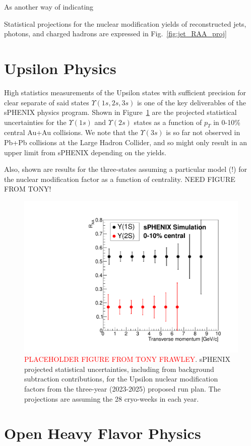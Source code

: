 As another way of indicating 

Statistical projections for the nuclear modification  yields of reconstructed jets, photons, and charged hadrons are expressed in Fig.~\ref{fig:jet_RAA_proj} 

\section{Upsilon Physics}
\label{sec:upsilon}

High statistics measurements of the Upsilon states with sufficient precision for clear separate of said states $\Upsilon(1s,2s,3s)$ is one of the key deliverables of the sPHENIX physics program.  Shown in Figure~\ref{fig:upsilon3years} are the projected statistical uncertainties for the $\Upsilon(1s)$ and $\Upsilon(2s)$ states as a function of $p_{T}$ in 0-10\% central Au+Au collisions.   We note that the $\Upsilon(3s)$ is so far not observed in Pb+Pb collisions at the Large Hadron Collider, and so might only result in an upper limit from sPHENIX depending on the yields.   

Also, shown are results for the three-states assuming a particular model (!) for the nuclear modification factor as a function of centrality.   NEED FIGURE FROM TONY!

\begin{figure}
    \centering
    \includegraphics[width=0.55\linewidth]{figs/BUP_Upsilon_RAA_3yr_28wks.pdf}
    \caption{{\textcolor{red}{PLACEHOLDER FIGURE FROM TONY FRAWLEY}}. sPHENIX projected statistical uncertainties, including from background subtraction contributions, for the Upsilon nuclear modification factors from the three-year (2023-2025) proposed run plan.   The projections are assuming the 28 cryo-weeks in each year.
    \label{fig:upsilon3years}}
\end{figure}

\section{Open Heavy Flavor Physics}
\label{sec:HF}


